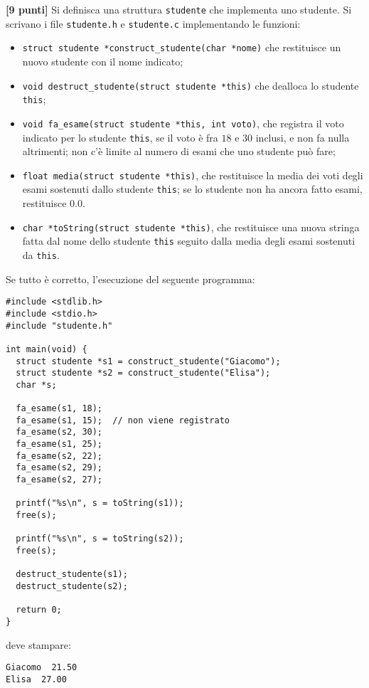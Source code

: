 \documentclass{article}[10pt]
\newcounter{esnu}
\newenvironment{esercizio}{\medskip \noindent {\bf Esercizio\addtocounter{esnu}{1} \arabic{esnu}}}{}
\begin{document}
\begin{esercizio}
\textbf{[9 punti]}
%
Si definisca una struttura \texttt{studente} che implementa uno studente.
Si scrivano i file \texttt{studente.h} e \texttt{studente.c} implementando le funzioni:
%
\begin{itemize}
\item \texttt{struct studente *construct\_studente(char *nome)} che restituisce un
      nuovo studente con il nome indicato;
\item \texttt{void destruct\_studente(struct studente *this)} che dealloca lo studente \texttt{this};
\item \texttt{void fa\_esame(struct studente *this, int voto)},
      che registra il voto indicato per lo studente \texttt{this}, se il voto \`e
      fra $18$ e $30$ inclusi, e non fa nulla altrimenti; non c'\`e limite al
      numero di esami che uno studente pu\`o fare;
\item \texttt{float media(struct studente *this)}, che restituisce la media dei voti
      degli esami sostenuti dallo studente \texttt{this}; se lo studente non ha ancora fatto esami,
      restituisce $0.0$.
\item \texttt{char *toString(struct studente *this)}, che restituisce una nuova stringa
      fatta dal nome dello studente \texttt{this} seguito dalla media degli esami sostenuti da
      \texttt{this}.
\end{itemize}
%
Se tutto \`e corretto, l'esecuzione del seguente programma:

{\small
\begin{verbatim}
#include <stdlib.h>
#include <stdio.h>
#include "studente.h"

int main(void) {
  struct studente *s1 = construct_studente("Giacomo");
  struct studente *s2 = construct_studente("Elisa");
  char *s;

  fa_esame(s1, 18);
  fa_esame(s1, 15);  // non viene registrato
  fa_esame(s2, 30);
  fa_esame(s1, 25);
  fa_esame(s2, 22);
  fa_esame(s2, 29);
  fa_esame(s2, 27);

  printf("%s\n", s = toString(s1));
  free(s);

  printf("%s\n", s = toString(s2));
  free(s);

  destruct_studente(s1);
  destruct_studente(s2);

  return 0;
}
\end{verbatim}}

\noindent
deve stampare:

{\small
\begin{verbatim}
Giacomo  21.50
Elisa  27.00
\end{verbatim}
}

\end{esercizio}
%
\end{document}
